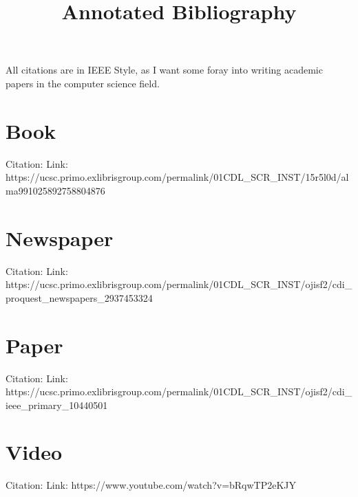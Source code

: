 \documentclass{article}
\title{Annotated Bibliography}
\begin{document}
\maketitle

All citations are in IEEE Style, as I want some foray into writing academic papers in
the computer science field.



\section{Book}

Citation: \cite{stokes2021}
Link: https://ucsc.primo.exlibrisgroup.com/permalink/01CDL_SCR_INST/15r5l0d/alma991025892758804876



\section{Newspaper}

Citation: \cite{thomas2024}
Link: https://ucsc.primo.exlibrisgroup.com/permalink/01CDL_SCR_INST/ojisf2/cdi_proquest_newspapers_2937453324

\section{Paper}

Citation: \cite{ma2024}
Link: https://ucsc.primo.exlibrisgroup.com/permalink/01CDL_SCR_INST/ojisf2/cdi_ieee_primary_10440501

\section{Video}

Citation: \cite{bloomberglaw2023}
Link: https://www.youtube.com/watch?v=bRqwTP2eKJY

\medskip

\printbibliography
\end{document}
